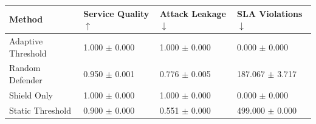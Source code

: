 \begin{tabular}{llll}
\toprule
Method & Service Quality $\uparrow$ & Attack Leakage $\downarrow$ & SLA Violations $\downarrow$ \\
\midrule
Adaptive Threshold & 1.000 $\pm$ 0.000 & 1.000 $\pm$ 0.000 & 0.000 $\pm$ 0.000 \\
Random Defender & 0.950 $\pm$ 0.001 & 0.776 $\pm$ 0.005 & 187.067 $\pm$ 3.717 \\
Shield Only & 1.000 $\pm$ 0.000 & 1.000 $\pm$ 0.000 & 0.000 $\pm$ 0.000 \\
Static Threshold & 0.900 $\pm$ 0.000 & 0.551 $\pm$ 0.000 & 499.000 $\pm$ 0.000 \\
\bottomrule
\end{tabular}
